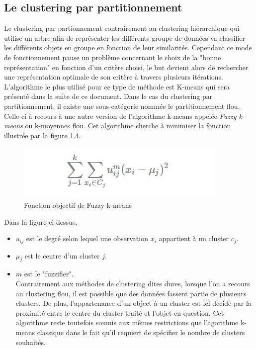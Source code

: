 \documentclass[memoire.tex]{subfiles}
\begin{document}
\newpage
\subsection{Le clustering par partitionnement}
Le clustering par partionnement contrairement au clustering hiérarchique qui utilise un arbre afin de représenter les différents groupe de données va classifier les différents objets en groupe en fonction de leur similarités. Cependant ce mode de fonctionnement pause un problème concernant le choix de la "bonne représentation" en fonction d'un critère choisi, le but devient alors de rechercher une représentation optimale de son critère à travers plusieurs itérations.\cite{ref8} L'algorithme le plus utilisé pour ce type de méthode est K-means qui sera présenté dans la suite de ce document. Dans le cas du clustering par partitionnement, il existe une sous-catégorie nommée le partitionnement flou. Celle-ci à recours à une autre version de l'algorithme k-means appelée \textit{Fuzzy k-means} ou k-moyennes flou. Cet algorithme cherche à minimiser la fonction illustrée par la figure 1.4.
	\begin{figure}[h!]
		\centerline{\includegraphics[scale=0.8]{img/fuzzy_algo.png}}
		\caption{Fonction objectif de Fuzzy k-means}
	\end{figure}
Dans la figure ci-dessus, \begin{itemize}
\item $u_{ij}$ est le degré selon lequel une observation $x_{i}$ appartient à un cluster $c_{j}$.
\item $\mu_j$ est le centre d'un cluster $j$.
\item $m$ est le "fuzzifier".\\
Contrairement aux méthodes de clustering dites dures, lorsque l'on a recours au clustering flou, il est possible que des données fassent partie de plusieurs clusters. De plus, l'appartenance d'un object à un cluster est ici décidé par la proximité entre le centre du cluster traité et l'objet en question. \cite{ref13} Cet algorithme reste toutefois soumis aux mêmes restrictions que l'agorithme k-means classique dans le fait qu'il requiert de spécifier le nombre de clusters souhaités.
\end{itemize}
\end{document}
